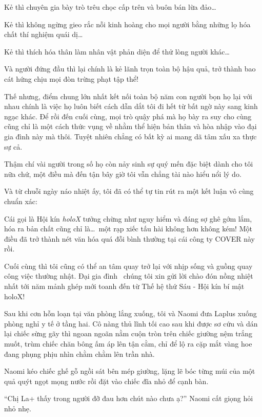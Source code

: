 \documentclass[../main.tex]{subfiles}
\begin{document}
Kẻ thì chuyên gia bày trò trêu chọc cấp trên và buôn bán lừa đảo\dots

Kẻ thì không ngừng gieo rắc nỗi kinh hoàng cho mọi người bằng những lọ hóa chất thí nghiệm quái dị\dots

Kẻ thì thích hóa thân làm nhân vật phản diện để thử lòng người khác\dots

Và người đứng đầu thì lại chính là kẻ lãnh trọn toàn bộ hậu quả, trở thành bao cát hứng chịu mọi đòn trừng phạt tập thể!

Thế nhưng, điểm chung lớn nhất kết nối toàn bộ năm con người bọn họ lại với nhau chính là việc họ luôn biết cách dẫn dắt tôi đi hết từ bất ngờ này sang kinh ngạc khác. Để rồi đến cuối cùng, mọi trò quậy phá mà họ bày ra suy cho cùng cũng chỉ là một cách thức vụng về nhằm thể hiện bản thân và hòa nhập vào đại gia đình này mà thôi. Tuyệt nhiên chẳng có bất kỳ ai mang dã tâm xấu xa thực sự cả.

Thậm chí vài người trong số họ còn nảy sinh sự quý mến đặc biệt dành cho tôi nữa chứ, một điều mà đến tận bây giờ tôi vẫn chẳng tài nào hiểu nổi lý do.

Và từ chuỗi ngày náo nhiệt ấy, tôi đã có thể tự tin rút ra một kết luận vô cùng chuẩn xác:

Cái gọi là Hội kín \textit{holoX} tưởng chừng như nguy hiểm và đáng sợ ghê gớm lắm, hóa ra bản chất cũng chỉ là\dots\ một rạp xiếc tấu hài không hơn không kém! Một điều đã trở thành nét văn hóa quá đỗi bình thường tại cái công ty COVER này rồi.

Cuối cùng thì tôi cũng có thể an tâm quay trở lại với nhịp sống và guồng quay công việc thường nhật. Đại gia đình \hll\ chúng tôi xin gửi lời chào đón nồng nhiệt nhất tới năm mảnh ghép mới toanh đến từ Thế hệ thứ Sáu - Hội kín bí mật holoX!

\omk

Sau khi cơn hỗn loạn tại văn phòng lắng xuống, tôi và Naomi đưa Laplus xuống phòng nghỉ y tế ở tầng hai. Cô nàng thủ lĩnh tối cao sau khi được sơ cứu và dán lại chiếc sừng gãy thì ngoan ngoãn nằm cuộn tròn trên chiếc giường nệm trắng muốt, trùm chiếc chăn bông ấm áp lên tận cằm, chỉ để lộ ra cặp mắt vàng hoe đang phụng phịu nhìn chằm chằm lên trần nhà.

Naomi kéo chiếc ghế gỗ ngồi sát bên mép giường, lặng lẽ bóc từng múi của một quả quýt ngọt mọng nước rồi đặt vào chiếc đĩa nhỏ để cạnh bàn.

``Chị La+ thấy trong người đỡ đau hơn chút nào chưa ạ?'' Naomi cất giọng hỏi nhỏ nhẹ.
\end{document}
